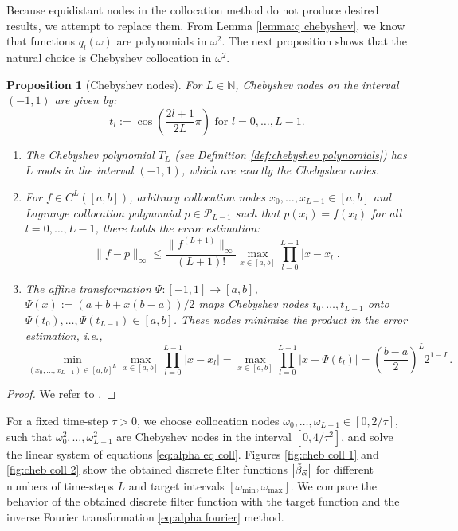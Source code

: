 \documentclass[a4paper,11pt,bibliography=totoc,listof=totoc,headinclude=true,cleardoublepage=empty,oneside]{scrbook}
\newtheorem{prop}[theorem]{Proposition}
\newcommand{\N}{\mathbb{N}}
\newcommand{\dffv}{\Tilde{\beta}_{\Vec{\alpha}}}
\begin{document}
Because equidistant nodes in the collocation method do not produce desired results, we attempt to replace them. From Lemma \ref{lemma:q chebyshev}, we know that functions $q_l(\omega)$ are polynomials in $\omega^2$. The next proposition shows that the natural choice is Chebyshev collocation in $\omega^2$.

\begin{prop}[Chebyshev nodes] \label{def:chebyshev nodes}
    For $L\in\N$, Chebyshev nodes on the interval $(-1, 1)$ are given by:
    \begin{equation*}
        t_l := \cos\left(\frac{2l+1}{2L}\pi\right) \text{ for } l = 0, \dots, L-1.
    \end{equation*}
    \begin{enumerate}
        \item The Chebyshev polynomial $T_L$ (see Definition \ref{def:chebyshev polynomials}) has $L$ roots in the interval $(-1, 1)$, which are exactly the Chebyshev nodes.
        \item For $f \in C^{L}\left([a,b]\right)$, arbitrary collocation nodes $x_0, \dots, x_{L-1} \in [a,b]$ and Lagrange collocation polynomial $p\in \mathcal{P}_{L-1}$ such that $p(x_l) = f(x_l)$ for all $l=0, \dots, L-1$, there holds the error estimation:
        \begin{equation}\label{eq:lagrange error est}
            \|f-p\|_\infty \leqslant \frac{\|f^{(L+1)}\|_\infty}{(L+1)!} \max_{x\in[a,b]} \prod_{l=0}^{L-1} \left|x-x_l\right|.
        \end{equation}
        \item The affine transformation $\Psi: [-1, 1] \rightarrow [a,b]$, $\Psi(x) := \left(a+b+x(b-a)\right)/2$ maps Chebyshev nodes $t_0, \dots, t_{L-1}$ onto $\Psi(t_0), \dots, \Psi(t_{L-1}) \in [a,b]$. These nodes minimize the product in the error estimation, i.e.,
        \begin{equation*}
            \min_{(x_0, \dots, x_{L-1})\in [a,b]^L}  \max_{x\in[a,b]} \prod_{l=0}^{L-1} \left|x-x_l\right| =  \max_{x\in[a,b]} \prod_{l=0}^{L-1} \left|x-\Psi(t_l)\right| = \left(\frac{b-a}{2}\right)^{L} 2^{1-L}.
        \end{equation*}
    \end{enumerate}
\end{prop}
\begin{proof}
    We refer to \cite[p. 23--24]{numericsAB}.
\end{proof}

For a fixed time-step $\tau>0$, we choose collocation nodes $\omega_0, \dots, \omega_{L-1} \in \left[0, 2/\tau\right]$, such that $\omega_0^2, \dots, \omega_{L-1}^2$ are Chebyshev nodes in the interval $\left[0, 4/\tau^2\right]$, and solve the linear system of equations \eqref{eq:alpha eq coll}. Figures \ref{fig:cheb coll 1} and \ref{fig:cheb coll 2} show the obtained discrete filter functions $\left|\dffv\right|$ for different numbers of time-steps $L$ and target intervals $\left[\omega_{\min}, \omega_{\max} \right]$. We compare the behavior of the obtained discrete filter function with the target function and the inverse Fourier transformation \eqref{eq:alpha fourier} method.
\end{document}
